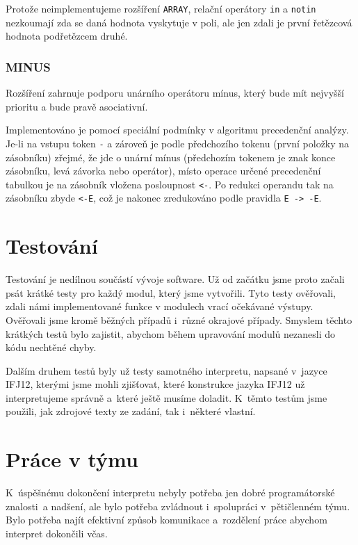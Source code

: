 \documentclass[12pt,a4paper,titlepage,final]{article}
\begin{document}
Protože neimplementujeme rozšíření \texttt{ARRAY}, relační operátory \texttt{in}
a \texttt{notin} nezkoumají zda se daná hodnota vyskytuje v poli, ale jen zdali
je první řetězcová hodnota podřetězcem druhé.

\subsubsection{MINUS}
Rozšíření zahrnuje podporu unárního operátoru mínus, který bude mít nejvyšší
prioritu a bude pravě asociativní.

Implementováno je pomocí speciální podmínky v algoritmu precedenční analýzy.
Je-li na vstupu token \texttt{-} a zároveň je podle předchozího tokenu (první
položky na zásobníku) zřejmé, že jde o unární mínus (předchozím tokenem
je znak konce zásobníku, levá závorka nebo operátor), místo operace určené
precedenční tabulkou je na zásobník vložena posloupnost \texttt{<-}. Po redukci
operandu tak na zásobníku zbyde \texttt{<-E}, což je nakonec zredukováno
podle pravidla \texttt{E -> -E}.


\section{Testování} \label{testovani}
Testování je nedílnou součástí vývoje software. Už od začátku jsme proto začali 
psát krátké testy pro každý modul, který jsme vytvořili. Tyto testy ověřovali,
zdali námi implementované funkce v modulech vrací očekávané výstupy. Ověřovali 
jsme kromě běžných případů i~různé okrajové případy. Smyslem těchto krátkých testů 
bylo zajistit, abychom během upravování modulů nezanesli do kódu nechtěné chyby.

Dalším druhem testů byly už testy samotného interpretu, napsané v~jazyce IFJ12, 
kterými jsme mohli zjišťovat, které konstrukce jazyka IFJ12 už interpretujeme 
správně a~které ještě musíme doladit. K~těmto testům jsme použili, jak zdrojové 
texty ze zadání, tak i~některé vlastní.

\section{Práce v týmu} \label{prace_v_tymu}
K~úspěšnému dokončení interpretu nebyly potřeba jen dobré programátorské 
znalosti~a nadšení, ale bylo potřeba zvládnout i~spolupráci v~pětičlenném týmu. 
Bylo potřeba najít efektivní způsob komunikace a~rozdělení práce abychom interpret 
dokončili včas.
\end{document}
